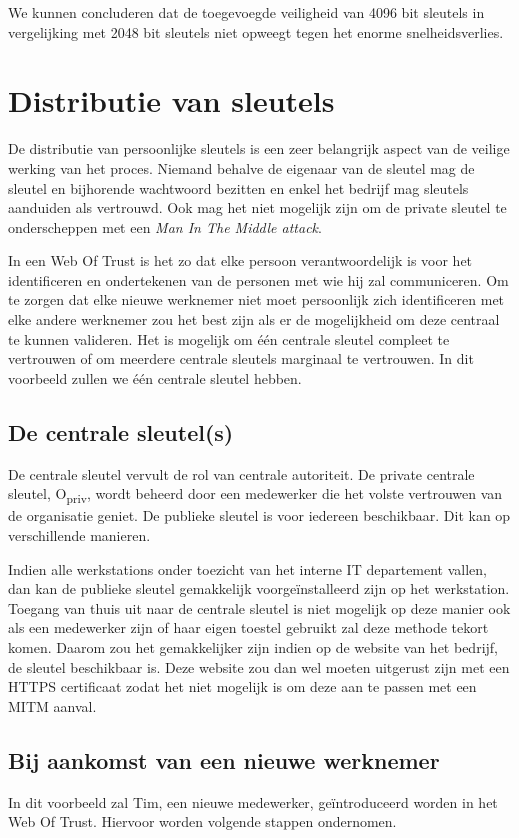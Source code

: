 We kunnen concluderen dat de toegevoegde veiligheid van 4096 bit sleutels in
vergelijking met 2048 bit sleutels niet opweegt tegen het enorme
snelheidsverlies.

\section{Distributie van sleutels}
\label{sec:distributie-van-sleutels}

De distributie van persoonlijke sleutels is een zeer belangrijk aspect van de
veilige werking van het proces. Niemand behalve de eigenaar van de sleutel mag
de sleutel en bijhorende wachtwoord bezitten en enkel het bedrijf mag sleutels
aanduiden als vertrouwd. Ook mag het niet mogelijk zijn om de private sleutel te
onderscheppen met een \textit{Man In The Middle attack}.

In een Web Of Trust is het zo dat elke persoon verantwoordelijk is voor het
identificeren en ondertekenen van de personen met wie hij zal communiceren. Om
te zorgen dat elke nieuwe werknemer niet moet persoonlijk zich identificeren met
elke andere werknemer zou het best zijn als er de mogelijkheid om deze centraal
te kunnen valideren. Het is mogelijk om één centrale sleutel compleet te
vertrouwen of om meerdere centrale sleutels marginaal te vertrouwen. In dit
voorbeeld zullen we één centrale sleutel hebben.

\subsection{De centrale sleutel(s)}
De centrale sleutel vervult de rol van centrale autoriteit. De private centrale
sleutel, O\textsubscript{priv}, wordt beheerd door een medewerker die het volste
vertrouwen van de organisatie geniet. De publieke sleutel is voor iedereen
beschikbaar. Dit kan op verschillende manieren.

Indien alle werkstations onder toezicht van het interne IT departement vallen,
dan kan de publieke sleutel gemakkelijk voorgeïnstalleerd zijn op het
werkstation. Toegang van thuis uit naar de centrale sleutel is niet mogelijk op
deze manier ook als een medewerker zijn of haar eigen toestel gebruikt zal deze
methode tekort komen. Daarom zou het gemakkelijker zijn indien op de website van
het bedrijf, de sleutel beschikbaar is. Deze website zou dan wel moeten
uitgerust zijn met een HTTPS certificaat zodat het niet mogelijk is om deze aan
te passen met een MITM aanval.

\subsection{Bij aankomst van een nieuwe werknemer}
\label{subsec:aankomst-nieuwe-werknemer}
In dit voorbeeld zal Tim, een nieuwe medewerker, geïntroduceerd worden in het
Web Of Trust. Hiervoor worden volgende stappen ondernomen.

